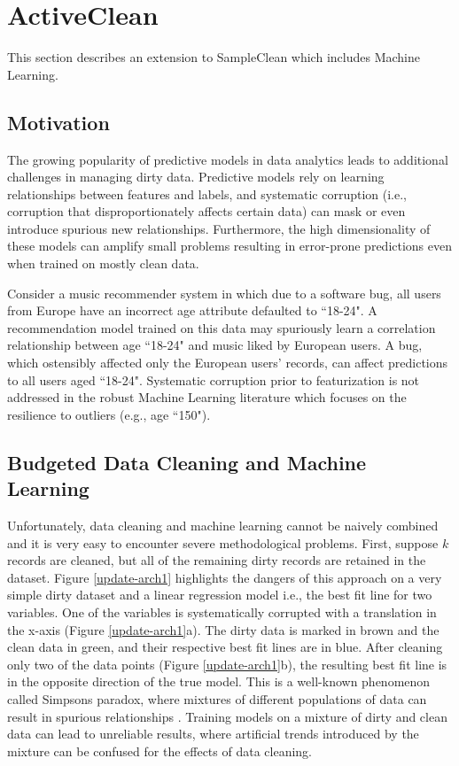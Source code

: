 \section{ActiveClean}
This section describes an extension to SampleClean which includes Machine Learning.

\subsection{Motivation}
The growing popularity of predictive models in data analytics \cite{bdas, alexandrov2014stratosphere, crotty2014tupleware, hellerstein2012madlib} leads to additional challenges in managing dirty data.
Predictive models rely on learning relationships between features and labels, and systematic corruption \cite{taylor1982introduction} (i.e., corruption that disproportionately affects certain data) can mask or even introduce spurious new relationships.
Furthermore, the high dimensionality of these models can amplify small problems \cite{xiaofeature} resulting in error-prone predictions even when trained on mostly clean data.

Consider a music recommender system in which due to a software bug, all users from Europe have an incorrect age attribute defaulted to ``18-24".
A recommendation model trained on this data may spuriously learn a correlation relationship between age ``18-24" and music liked by European users.
A bug, which ostensibly affected only the European users' records, can affect predictions to all users aged ``18-24".
Systematic corruption prior to featurization is not addressed in the robust Machine Learning literature which focuses on the resilience to outliers (e.g., age ``150").

\subsection{Budgeted Data Cleaning and Machine Learning}
Unfortunately, data cleaning and machine learning cannot be naively combined and it is very easy to encounter severe methodological problems.
First, suppose $k$ records are cleaned, but all of the remaining dirty records are retained in the dataset.
Figure \ref{update-arch1} highlights the dangers of this approach on a very simple dirty dataset and a linear regression model i.e., the best fit line for two variables. 
One of the variables is systematically corrupted with a translation in the x-axis (Figure \ref{update-arch1}a).
The dirty data is marked in brown and the clean data in green, and their respective best fit lines are in blue.
After cleaning only two of the data points (Figure \ref{update-arch1}b), the resulting best fit line is in the opposite direction of the true model.
This is a well-known phenomenon called Simpsons paradox, where mixtures of different populations of data can result in spurious relationships \cite{simpson1951interpretation}.
Training models on a mixture of dirty and clean data can lead to unreliable results, where artificial trends introduced by the mixture can be confused for the effects of data cleaning.


